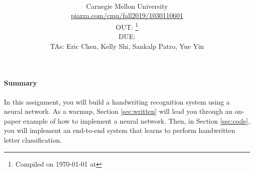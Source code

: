 \documentclass[11pt]{article}
\title{\textsc{\hwName}} %
\author{\courseName\\
  Carnegie Mellon University \\
\url{piazza.com/cmu/fall2019/1030110601} \\
OUT: \outDate{}\thanks{Compiled on \today{} at \currenttime{}} \\
DUE: \dueDate{} \\ 
TAs: Eric Chen, Kelly Shi, Sankalp Patro, Yue Yin}
\date{}
\date{}
\numberwithin{equation}{section} %
\numberwithin{figure}{section} %
\numberwithin{table}{section} %
\begin{document}
\maketitle

\begin{notebox}
\paragraph{Summary} In this assignment, you will build a handwriting recognition system using a neural network. As a warmup, Section \ref{sec:written} will lead you through an on-paper example of how to implement a neural network. Then, in Section \ref{sec:code}, you will implement an end-to-end system that learns to perform handwritten letter classification.
\end{notebox}
\end{document}
